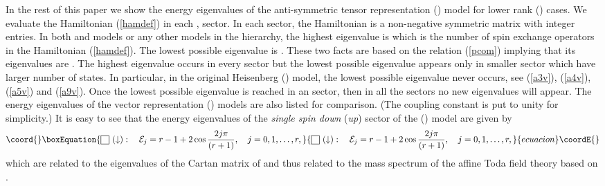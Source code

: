 \documentclass[a4paper,12pt]{article}
\def\sqr#1#2{{\vcenter{\hrule height.#2pt
      \hbox{\vrule width.#2pt height#1pt \kern#1pt
          \vrule width.#2pt}
      \hrule height.#2pt}}}
\begin{document}
In the rest of this paper we show the energy eigenvalues of the
anti-symmetric
tensor representation (\coordHE{}) model for lower rank (\coordHE{}) cases.
We evaluate the Hamiltonian (\ref{hamdef}) in each \coordHE{}, \coordHE{}
sector. In each sector, the Hamiltonian is a non-negative symmetric matrix
with integer entries. In both \coordHE{} and
\coordHE{} models or any other models
in the hierarchy, the highest eigenvalue is \coordHE{} which is the number of
spin
exchange operators
\coordHE{} in  the Hamiltonian (\ref{hamdef}). The lowest possible
eigenvalue is
\coordHE{}. These two facts are based on the relation
\coordHE{} (\ref{pcom}) implying that its eigenvalues are
\coordHE{}.
The highest eigenvalue \coordHE{} occurs in every \coordHE{}
sector but the lowest possible
eigenvalue \coordHE{} appears only in smaller \coordHE{}
sector which have larger number of states. In particular, in the original
Heisenberg (\coordHE{}) model,
the lowest possible eigenvalue \coordHE{} never occurs,
see (\ref{a3v}), (\ref{a4v}), (\ref{a5v}) and (\ref{a9v}).
Once the lowest possible eigenvalue \coordHE{} is reached in an \coordHE{}
sector,  then in all the \coordHE{} sectors no new eigenvalues will appear.
The energy eigenvalues of the vector representation
(\coordHE{}) models are also
listed for comparison.
(The coupling constant \coordHE{} is put to unity for simplicity.)
It is easy to see that the energy eigenvalues of the
{\em single spin down\/}
({\em up\/}) sector of the (\coordHE{}) model are given by
\begin{equation}\coord{}\boxEquation{
{\sqr{9}5}\ (\downarrow):\quad {\cal E}_j=
r-1+2\cos{2j\pi\over{(r+1)}},\quad j=0,1,\ldots,r,
}{
{\sqr{9}5}\ (\downarrow):\quad {\cal E}_j=
r-1+2\cos{2j\pi\over{(r+1)}},\quad j=0,1,\ldots,r,
}{ecuacion}\coordE{}\end{equation}
which are related to the eigenvalues of the Cartan matrix of \coordHE{} and
thus related to the mass spectrum of the affine Toda field theory based on
\coordHE{} \cite{atft}.
\end{document}
